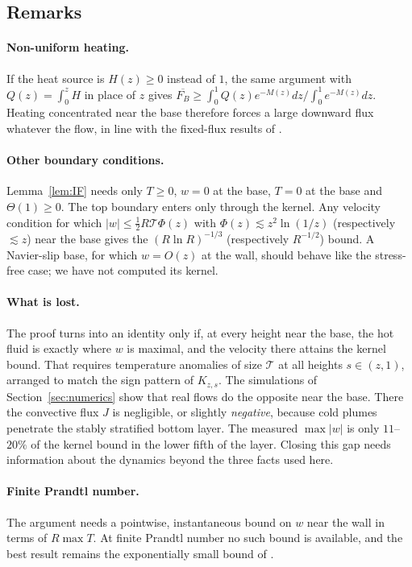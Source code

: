 \subsection{Remarks}

\paragraph{Non-uniform heating.} If the heat source is $H(z)\ge0$ instead of $1$, the same argument with
$Q(z)=\int_0^zH$ in place of $z$ gives
$\overline{F_B}\ge\int_0^1Q(z)e^{-M(z)}dz\big/\int_0^1e^{-M(z)}dz$. Heating concentrated near the base
therefore forces a large downward flux whatever the flow, in line with the fixed-flux results of
\citet{ArslanEtAl2024}.

\paragraph{Other boundary conditions.} Lemma~\ref{lem:IF} needs only $T\ge0$, $w=0$ at the base, $T=0$ at the
base and $\Theta(1)\ge0$. The top boundary enters only through the kernel. Any velocity condition for which
$|w|\le\frac12R\mathcal T\Phi(z)$ with $\Phi(z)\lesssim z^2\ln(1/z)$ (respectively $\lesssim z$) near the base
gives the $(R\ln R)^{-1/3}$ (respectively $R^{-1/2}$) bound. A Navier-slip base, for which $w=O(z)$ at the wall, should behave like the stress-free case;
we have not computed its kernel.

\paragraph{What is lost.} The proof turns into an identity only if, at every height near the base, the hot
fluid is exactly where $w$ is maximal, and the velocity there attains the kernel bound. That requires
temperature anomalies of size $\mathcal T$ at all heights $s\in(z,1)$, arranged to match the sign pattern of
$K_{z,s}$. The simulations of Section~\ref{sec:numerics} show that real flows do the opposite near the base. There the
convective flux $J$ is negligible, or slightly \emph{negative}, because cold plumes penetrate the stably
stratified bottom layer. The measured $\max|w|$ is only $11$--$20\%$ of the kernel bound in the lower fifth of
the layer. Closing this gap needs information about
the dynamics beyond the three facts used here.

\paragraph{Finite Prandtl number.} The argument needs a pointwise, instantaneous bound on $w$ near the wall in
terms of $R\max T$. At finite Prandtl number no such bound is available, and the best result remains the
exponentially small bound of \citet{KumarEtAl2022}.
